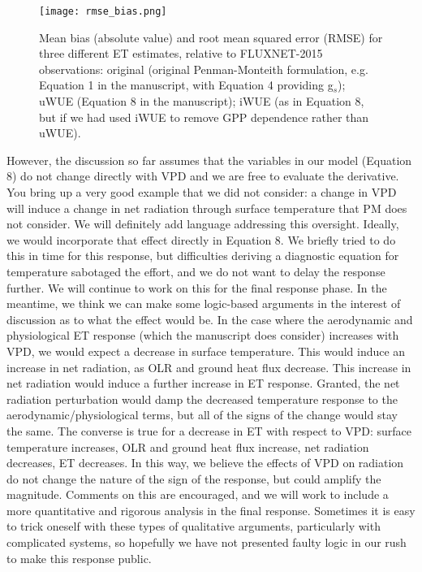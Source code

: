 \documentclass[12pt]{article}
\begin{document}
\begin{figure}
  \centering \texttt{[image: rmse\_bias.png]}
  \caption{Mean bias (absolute value) and root mean squared error
    (RMSE) for three different ET estimates, relative to FLUXNET-2015
    observations: original (original Penman-Monteith formulation,
    e.g. Equation 1 in the manuscript, with Equation 4 providing
    g$_s$); uWUE (Equation 8 in the manuscript); iWUE (as in Equation
    8, but if we had used iWUE to remove GPP dependence rather than
    uWUE).}
  \label{rmse}
\end{figure}

However, the discussion so far assumes that the variables in our model
(Equation 8) do not change directly with VPD and we are free to
evaluate the derivative. You bring up a very good example that we did
not consider: a change in VPD will induce a change in net radiation
through surface temperature that PM does not consider. We will
definitely add language addressing this oversight. Ideally, we would
incorporate that effect directly in Equation 8. We briefly tried to do
this in time for this response, but difficulties deriving a diagnostic
equation for temperature sabotaged the effort, and we do not want to
delay the response further. We will continue to work on this for the
final response phase. In the meantime, we think we can make some
logic-based arguments in the interest of discussion as to what the
effect would be. In the case where the aerodynamic and physiological
ET response (which the manuscript does consider) increases with VPD,
we would expect a decrease in surface temperature. This would induce
an increase in net radiation, as OLR and ground heat flux
decrease. This increase in net radiation would induce a further
increase in ET response. Granted, the net radiation perturbation would
damp the decreased temperature response to the
aerodynamic/physiological terms, but all of the signs of the change
would stay the same. The converse is true for a decrease in ET with
respect to VPD: surface temperature increases, OLR and ground heat
flux increase, net radiation decreases, ET decreases. In this way, we
believe the effects of VPD on radiation do not change the nature of
the sign of the response, but could amplify the magnitude. Comments on
this are encouraged, and we will work to include a more quantitative
and rigorous analysis in the final response. Sometimes it is easy to
trick oneself with these types of qualitative arguments, particularly
with complicated systems, so hopefully we have not presented faulty
logic in our rush to make this response public.
\end{document}

